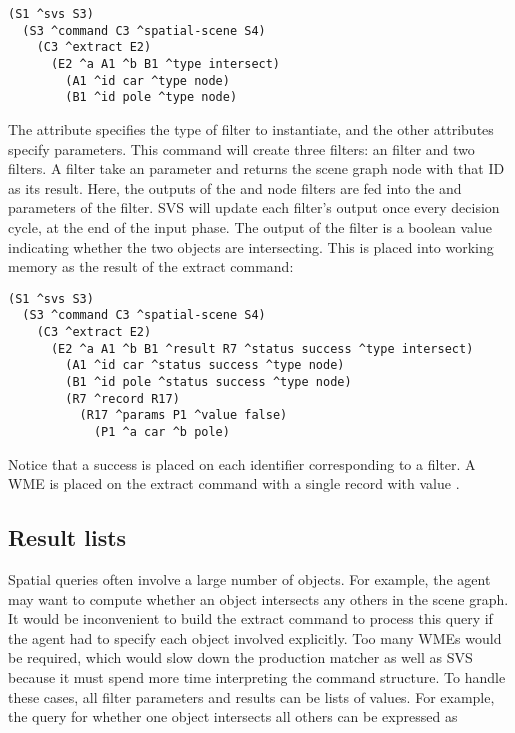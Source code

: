 \begin{verbatim}
(S1 ^svs S3)
  (S3 ^command C3 ^spatial-scene S4)
    (C3 ^extract E2)
      (E2 ^a A1 ^b B1 ^type intersect)
        (A1 ^id car ^type node)
        (B1 ^id pole ^type node)
\end{verbatim}

The  attribute specifies the type of filter to instantiate, and the other attributes specify parameters.
This command will create three filters: an  filter and two  filters.
A  filter take an  parameter and returns the scene graph node with that ID as its result.
Here, the outputs of the  and  node filters are fed into the  and  parameters of the  filter.
SVS will update each filter's output once every decision cycle, at the end of the input phase.
The output of the  filter is a boolean value indicating whether the two objects are intersecting.
This is placed into working memory as the result of the extract command:

\begin{verbatim}
(S1 ^svs S3)
  (S3 ^command C3 ^spatial-scene S4)
    (C3 ^extract E2)
      (E2 ^a A1 ^b B1 ^result R7 ^status success ^type intersect)
        (A1 ^id car ^status success ^type node)
        (B1 ^id pole ^status success ^type node)
        (R7 ^record R17)
          (R17 ^params P1 ^value false)
            (P1 ^a car ^b pole)
\end{verbatim}

Notice that a  success is placed on each identifier corresponding to a filter.
A  WME is placed on the extract command with a single record with value .

\subsection{Result lists}

Spatial queries often involve a large number of objects.
For example, the agent may want to compute whether an object intersects any others in the scene graph.
It would be inconvenient to build the extract command to process this query if the agent had to specify each object involved explicitly.
Too many WMEs would be required, which would slow down the production matcher as well as SVS because it must spend more time interpreting the command structure.
To handle these cases, all filter parameters and results can be lists of values.
For example, the query for whether one object intersects all others can be expressed as

